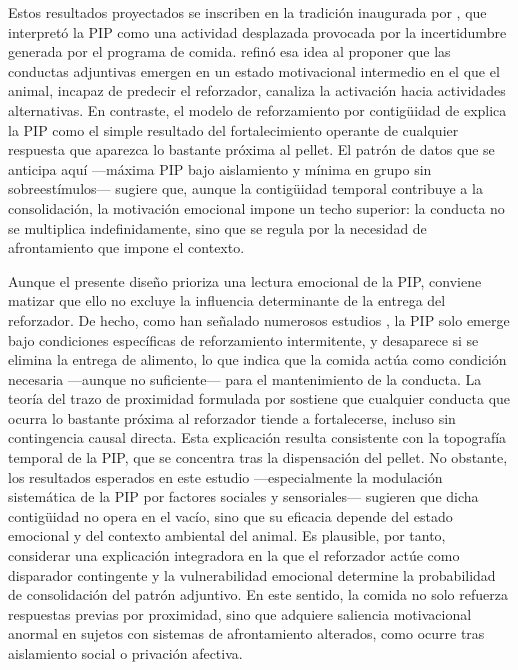 \documentclass[12pt,a4paper]{article}
\begin{document}
\begin{multicols}{2}
Estos resultados proyectados se inscriben en la tradición inaugurada por \citet{Falk1961}, que interpretó la PIP como una actividad desplazada provocada por la incertidumbre generada por el programa de comida. \citet{Staddon1977} refinó esa idea al proponer que las conductas adjuntivas emergen en un estado motivacional intermedio en el que el animal, incapaz de predecir el reforzador, canaliza la activación hacia actividades alternativas. En contraste, el modelo de reforzamiento por contigüidad de \citet{Killeen2013} explica la PIP como el simple resultado del fortalecimiento operante de cualquier respuesta que aparezca lo bastante próxima al pellet. El patrón de datos que se anticipa aquí —máxima PIP bajo aislamiento y mínima en grupo sin sobreestímulos— sugiere que, aunque la contigüidad temporal contribuye a la consolidación, la motivación emocional impone un techo superior: la conducta no se multiplica indefinidamente, sino que se regula por la necesidad de afrontamiento que impone el contexto.

Aunque el presente diseño prioriza una lectura emocional de la PIP, conviene matizar que ello no excluye la influencia determinante de la entrega del reforzador. De hecho, como han señalado numerosos estudios \citep{Pellon2004}, la PIP solo emerge bajo condiciones específicas de reforzamiento intermitente, y desaparece si se elimina la entrega de alimento, lo que indica que la comida actúa como condición necesaria —aunque no suficiente— para el mantenimiento de la conducta. La teoría del trazo de proximidad formulada por \citet{Killeen2013} sostiene que cualquier conducta que ocurra lo bastante próxima al reforzador tiende a fortalecerse, incluso sin contingencia causal directa. Esta explicación resulta consistente con la topografía temporal de la PIP, que se concentra tras la dispensación del pellet. No obstante, los resultados esperados en este estudio —especialmente la modulación sistemática de la PIP por factores sociales y sensoriales— sugieren que dicha contigüidad no opera en el vacío, sino que su eficacia depende del estado emocional y del contexto ambiental del animal. Es plausible, por tanto, considerar una explicación integradora en la que el reforzador actúe como disparador contingente y la vulnerabilidad emocional determine la probabilidad de consolidación del patrón adjuntivo. En este sentido, la comida no solo refuerza respuestas previas por proximidad, sino que adquiere saliencia motivacional anormal en sujetos con sistemas de afrontamiento alterados, como ocurre tras aislamiento social o privación afectiva.


\end{multicols}
\end{document}
